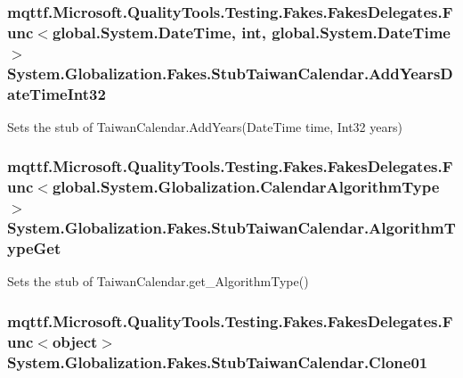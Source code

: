 \hypertarget{class_system_1_1_globalization_1_1_fakes_1_1_stub_taiwan_calendar_a4f6e2936117ba147c50b7cf13d58997e}{
\subsubsection[{Add\-Years\-Date\-Time\-Int32}]{\setlength{\rightskip}{0pt plus 5cm}mqttf.\-Microsoft.\-Quality\-Tools.\-Testing.\-Fakes.\-Fakes\-Delegates.\-Func$<$global.\-System.\-Date\-Time, int, global.\-System.\-Date\-Time$>$ System.\-Globalization.\-Fakes.\-Stub\-Taiwan\-Calendar.\-Add\-Years\-Date\-Time\-Int32}}\label{class_system_1_1_globalization_1_1_fakes_1_1_stub_taiwan_calendar_a4f6e2936117ba147c50b7cf13d58997e}


Sets the stub of Taiwan\-Calendar.\-Add\-Years(\-Date\-Time time, Int32 years)

\hypertarget{class_system_1_1_globalization_1_1_fakes_1_1_stub_taiwan_calendar_a5fa0c54b67c735e7a128d7a6c2f53996}{
\subsubsection[{Algorithm\-Type\-Get}]{\setlength{\rightskip}{0pt plus 5cm}mqttf.\-Microsoft.\-Quality\-Tools.\-Testing.\-Fakes.\-Fakes\-Delegates.\-Func$<$global.\-System.\-Globalization.\-Calendar\-Algorithm\-Type$>$ System.\-Globalization.\-Fakes.\-Stub\-Taiwan\-Calendar.\-Algorithm\-Type\-Get}}\label{class_system_1_1_globalization_1_1_fakes_1_1_stub_taiwan_calendar_a5fa0c54b67c735e7a128d7a6c2f53996}


Sets the stub of Taiwan\-Calendar.\-get\-\_\-\-Algorithm\-Type()

\hypertarget{class_system_1_1_globalization_1_1_fakes_1_1_stub_taiwan_calendar_afa886acfa325244a131ee579e9dc4c14}{
\subsubsection[{Clone01}]{\setlength{\rightskip}{0pt plus 5cm}mqttf.\-Microsoft.\-Quality\-Tools.\-Testing.\-Fakes.\-Fakes\-Delegates.\-Func$<$object$>$ System.\-Globalization.\-Fakes.\-Stub\-Taiwan\-Calendar.\-Clone01}}\label{class_system_1_1_globalization_1_1_fakes_1_1_stub_taiwan_calendar_afa886acfa325244a131ee579e9dc4c14}


